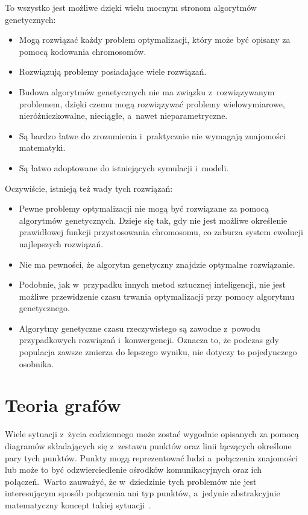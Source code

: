 \documentclass[twoside,12pt]{report}
\begin{document}
To wszystko jest możliwe dzięki wielu mocnym stronom algorytmów genetycznych:
\begin{itemize}
\item Mogą rozwiązać każdy problem optymalizacji, który może być opisany za pomocą kodowania chromosomów.
\item Rozwiązują problemy posiadające wiele rozwiązań.
\item Budowa algorytmów genetycznych nie ma związku z~rozwiązywanym problemem, dzięki czemu mogą rozwiązywać problemy wielowymiarowe, nieróżniczkowalne, nieciągłe, a~nawet nieparametryczne.
\item Są bardzo łatwe do zrozumienia i~praktycznie nie wymagają znajomości matematyki.
\item Są łatwo adoptowane do istniejących symulacji i~modeli.
\end{itemize}

Oczywiście, istnieją też wady tych rozwiązań:
\begin{itemize}
\item Pewne problemy optymalizacji nie mogą być rozwiązane za pomocą algorytmów genetycznych. Dzieje się tak, gdy nie jest możliwe określenie prawidłowej funkcji przystosowania chromosomu, co zaburza system ewolucji najlepszych rozwiązań.
\item Nie ma pewności, że algorytm genetyczny znajdzie optymalne rozwiązanie.
\item Podobnie, jak w~przypadku innych metod sztucznej inteligencji, nie jest możliwe przewidzenie czasu trwania optymalizacji przy pomocy algorytmu genetycznego.
\item Algorytmy genetyczne czasu rzeczywistego są zawodne z~powodu przypadkowych rozwiązań i~konwergencji. Oznacza to, że podczas gdy populacja zawsze zmierza do lepszego wyniku, nie dotyczy to pojedynczego osobnika.
\end{itemize}

\section{Teoria grafów}
Wiele sytuacji z~życia codziennego może zostać wygodnie opisanych za pomocą diagramów składających się z~zestawu punktów oraz linii łączących określone pary tych punktów. Punkty mogą reprezentować ludzi a~połączenia znajomości lub może to być odzwierciedlenie ośrodków komunikacyjnych oraz ich połączeń.~Warto zauważyć, że w~dziedzinie tych problemów nie jest interesującym sposób połączenia ani typ punktów, a~jedynie abstrakcyjnie matematyczny koncept takiej sytuacji~\cite{teoria-grafow-z-zast}.
\end{document}
